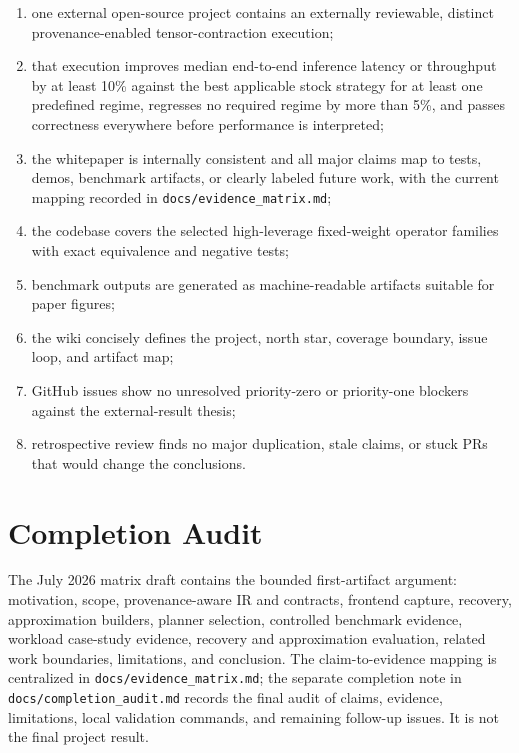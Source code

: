 \documentclass[11pt]{article}
\begin{document}
\begin{enumerate}
  \item one external open-source project contains an externally reviewable,
  distinct provenance-enabled tensor-contraction execution;
  \item that execution improves median end-to-end inference latency or
  throughput by at least 10\% against the best applicable stock strategy for at
  least one predefined regime, regresses no required regime by more than 5\%,
  and passes correctness everywhere before performance is interpreted;
  \item the whitepaper is internally consistent and all major claims map to
  tests, demos, benchmark artifacts, or clearly labeled future work, with the
  current mapping recorded in \texttt{docs/evidence\_matrix.md};
  \item the codebase covers the selected high-leverage fixed-weight operator
  families with exact equivalence and negative tests;
  \item benchmark outputs are generated as machine-readable artifacts suitable
  for paper figures;
  \item the wiki concisely defines the project, north star, coverage boundary,
  issue loop, and artifact map;
  \item GitHub issues show no unresolved priority-zero or priority-one blockers
  against the external-result thesis;
  \item retrospective review finds no major duplication, stale claims, or stuck
  PRs that would change the conclusions.
\end{enumerate}

\section{Completion Audit}

The July 2026 matrix draft contains the bounded first-artifact argument: motivation,
scope, provenance-aware IR and contracts, frontend capture, recovery,
approximation builders, planner selection, controlled benchmark evidence,
workload case-study evidence, recovery and approximation evaluation, related
work boundaries, limitations, and conclusion. The claim-to-evidence mapping is
centralized in \texttt{docs/evidence\_matrix.md}; the separate completion note
in \texttt{docs/completion\_audit.md} records the final audit of claims,
evidence, limitations, local validation commands, and remaining follow-up
issues. It is not the final project result.
\end{document}
